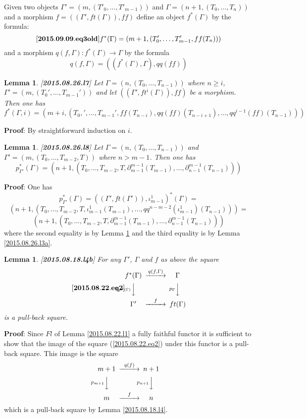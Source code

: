 \documentclass[11pt]{article}
\newenvironment{eq}{\begin{equation}}{\end{equation}}
\newenvironment{proof}{{\bf Proof}:}{\vskip 5mm }
\newtheorem{lemma}[proposition]{Lemma}
\newcommand{\llabel}[1]{\label{#1}[{\bf #1}]}
\newcommand{\sr}{\rightarrow}
\begin{document}
Given two objects $\Gamma'=(m,(T'_0,\dots,T'_{m-1}))$ and $\Gamma=(n+1,(T_0,\dots,T_{n}))$ and a morphism $f=((\Gamma',ft(\Gamma)),ff)$
define an object $f^*(\Gamma)$ by the formula:
%
\begin{eq}\llabel{2015.09.09.eq3old}
f^*(\Gamma)=(m+1,(T'_0,\dots,T'_{m-1},ff(T_{n})))
\end{eq}
%
and a morphism $q(f,\Gamma):f^*(\Gamma)\sr \Gamma$ by the formula
%
$$q(f,\Gamma)=((f^*(\Gamma),\Gamma), qq(ff))$$
% 
\begin{lemma}
\llabel{2015.08.26.l7}
Let $\Gamma=(n,(T_0,\dots,T_{n-1}))$ where $n\ge i$, $\Gamma'=(m,(T_0',\dots,T_{m-1}'))$ and let $((\Gamma',ft^i(\Gamma)),ff)$ be a morphism.
Then one has
%
$$f^*(\Gamma,i)=(m+i,(T_0,',\dots,T_{m-1}',ff(T_{n-i}),qq(ff)(T_{n-i+1}) ,\dots,qq^{i-1}(ff)(T_{n-1})))$$
%
\end{lemma}
%
\begin{proof}
By straightforward induction on $i$.
\end{proof}
%
\begin{lemma}
\llabel{2015.08.26.l8}
Let $\Gamma=(n,(T_0,\dots,T_{n-1}))$ and $\Gamma'=(m,(T_0,\dots,T_{m-2},T))$ where $n>m-1$. Then one has
%
$$p_{\Gamma'}^*(\Gamma)=(n+1,(T_0,\dots,T_{m-2},T,\partial_{m-1}^{m-1}(T_{m-1}),\dots,\partial_{n-1}^{m-1}(T_{n-1})))$$
%
\end{lemma}
%
\begin{proof}
One has
%
$$p_{\Gamma'}^*(\Gamma)=((\Gamma',ft(\Gamma')),\iota_{m-1}^1)^*(\Gamma)=$$$$(n+1,(T_0,\dots,T_{m-2},T,\iota_{m-1}^1(T_{m-1}),\dots,qq^{n-m-2}(\iota_{m-1}^1)(T_{n-1})))=$$
$$(n+1,(T_0,\dots,T_{m-2},T,\partial_{m-1}^{m-1}(T_{m-1}),\dots,\partial^{m-1}_{n-1}(T_{n-1})))$$
%
where the second equality is by Lemma \ref{2015.08.26.l7} and the third equality is by Lemma \ref{2015.08.26.l3a}.
\end{proof}
%
\begin{lemma}
\llabel{2015.08.18.l4b}
For any $\Gamma'$, $\Gamma$ and $f$ as above the square
%
\begin{eq}\llabel{2015.08.22.eq2}
\begin{CD}
f^*(\Gamma) @>q(f,\Gamma)>> \Gamma\\
@Vp_{f^*(\Gamma)}VV @Vp_{\Gamma}VV\\
\Gamma' @>f>> ft(\Gamma)
\end{CD}
\end{eq}
%
is a pull-back square.
\end{lemma}
%
\begin{proof}
Since $Fl$ of Lemma \ref{2015.08.22.l1} a fully faithful functor it is sufficient to show that the image of the square (\ref{2015.08.22.eq2}) under this functor is a pull-back square. This image is the square
%
$$
\begin{CD}
m+1 @>q(f)>> n+1\\
@Vp_{m+1}VV @Vp_{n+1}VV\\
m @>f>> n
\end{CD}
$$
%
which is a pull-back square by Lemma \ref{2015.08.18.l4}.
\end{proof}
\end{document}
